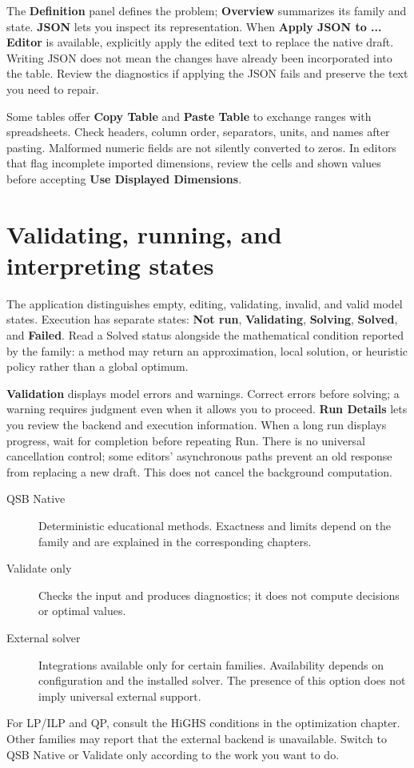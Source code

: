 The \textbf{Definition} panel defines the problem; \textbf{Overview} summarizes
its family and state. \textbf{JSON} lets you inspect its representation. When
\textbf{Apply JSON to ... Editor} is available, explicitly apply the edited text
to replace the native draft. Writing JSON does not mean the changes have
already been incorporated into the table. Review the diagnostics if applying the JSON fails and preserve the text you need to repair.

Some tables offer \textbf{Copy Table} and \textbf{Paste Table} to exchange ranges
with spreadsheets. Check headers, column order, separators, units, and names
after pasting. Malformed numeric fields are not silently converted to zeros.
In editors that flag incomplete imported dimensions, review the cells and
shown values before accepting \textbf{Use Displayed Dimensions}.

\section{Validating, running, and interpreting states}
The application distinguishes empty, editing, validating, invalid, and valid
model states. Execution has separate states: \textbf{Not run},
\textbf{Validating}, \textbf{Solving}, \textbf{Solved}, and \textbf{Failed}.
Read a Solved status alongside the mathematical condition reported by the
family: a method may return an approximation, local solution, or heuristic
policy rather than a global optimum.

\textbf{Validation} displays model errors and warnings. Correct errors before
solving; a warning requires judgment even when it allows you to proceed.
\textbf{Run Details} lets you review the backend and execution information.
When a long run displays progress, wait for completion before repeating Run.
There is no universal cancellation control; some editors' asynchronous paths
prevent an old response from replacing a new draft. This does not cancel the
background computation.

\begin{description}
 \item[QSB Native] Deterministic educational methods. Exactness and limits
 depend on the family and are explained in the corresponding chapters.
 \item[Validate only] Checks the input and produces diagnostics; it does not
 compute decisions or optimal values.
 \item[External solver] Integrations available only for certain families.
 Availability depends on configuration and the installed solver. The presence
 of this option does not imply universal external support.
\end{description}
For LP/ILP and QP, consult the HiGHS conditions in the optimization chapter.
Other families may report that the external backend is unavailable. Switch to
QSB Native or Validate only according to the work you want to do.

